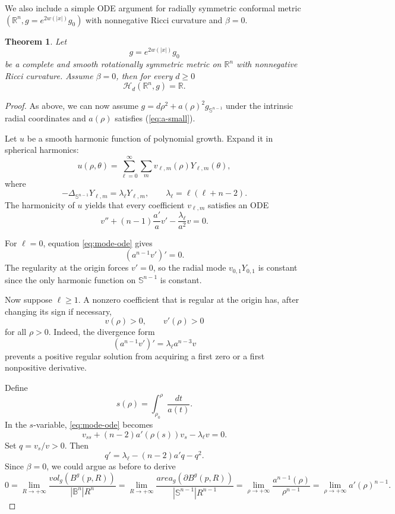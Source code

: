 \documentclass[10pt,a4paper]{amsart}
\newtheorem{theorem}{Theorem}[section]
\numberwithin{equation}{section}
\newcommand{\R}{\mathbb{R}}
\begin{document}
We also include a simple ODE argument for radially symmetric conformal metric $(\mathbb{R}^n, g=e^{2w(|x|)}g_0)$ with nonnegative Ricci curvature and $\beta=0$.

\begin{theorem}\label{thm:radial}
Let
\[
 g=e^{2w(|x|)}g_{0}
\]
be a complete and smooth rotationally symmetric metric on $\R^n$ with nonnegative Ricci curvature. Assume
$\beta=0$, then for every $d\ge0$
\[
 \mathcal{H}_d(\R^n,g)=\R.
\]
\end{theorem}

\begin{proof}
As above, we can now assume 
$g=d\rho^2+a(\rho)^2g_{\mathbb{S}^{n-1}}$ under the intrinsic radial coordinates and $a(\rho)$ satisfies (\ref{eq:a-small}).

Let $u$ be a smooth harmonic function of polynomial growth.  Expand it in spherical harmonics:
\[
 u(\rho,\theta)
 =\sum_{\ell=0}^\infty\sum_m
 v_{\ell,m}(\rho)Y_{\ell,m}(\theta),
\]
where
\[
 -\Delta_{\mathbb{S}^{n-1}}Y_{\ell,m}
 =\lambda_\ell Y_{\ell,m},
 \qquad
 \lambda_\ell=\ell(\ell+n-2).
\]
The harmonicity of $u$ yields that every coefficient $v_{\ell,m}$ satisfies an ODE
\begin{equation}\label{eq:mode-ode}
 v''+(n-1)\frac{a'}a v'
 -\frac{\lambda_\ell}{a^2}v=0.
\end{equation}

For $\ell=0$, equation \cref{eq:mode-ode} gives
\[
 (a^{n-1}v')'=0.
\]
The regularity at the origin forces $v'=0$, so the radial mode $ v_{0,1}Y_{0,1}$ is constant since the only harmonic function on $\mathbb{S}^{n-1}$ is constant. 

Now suppose $\ell\ge1$.  A nonzero coefficient that is regular at the origin has, after changing its sign if necessary,
\[
 v(\rho)>0,
 \qquad
 v'(\rho)>0
\]
for all $\rho>0$.  Indeed, the divergence form
\[
 (a^{n-1}v')'=\lambda_\ell a^{n-3}v
\]
prevents a positive regular solution from acquiring a first zero or a first nonpositive derivative.

Define
\[
 s(\rho)=\int_{\rho_0}^{\rho}\frac{dt}{a(t)}.
\]
In the $s$-variable, \cref{eq:mode-ode} becomes
\[
 v_{ss}+(n-2)a'(\rho(s))v_s-\lambda_\ell v=0.
\]
Set $q=v_s/v>0$.  Then
\begin{equation}\label{eq:riccati}
 q'=\lambda_\ell-(n-2)a' q-q^2.
\end{equation}
Since $\beta=0$, we could argue as before to derive 
\begin{equation}\label{eq:a-small_radial case}
    0=\lim_{R\to+\infty}
    \frac{vol_{g}(B^{g}(p,R))}{|\mathbb{B}^n|R^n}
    =\lim_{R\to+\infty}
    \frac{area_{g}
    (\partial B^{g}(p,R))}{|\mathbb{S}^{n-1}|R^{n-1}}
    =\lim_{\rho\to+\infty}
    \frac{a^{n-1}(\rho)}{\rho^{n-1}}
    =\lim_{\rho\to+\infty}a'(\rho)^{n-1}.
\end{equation}


\end{proof}
\end{document}
